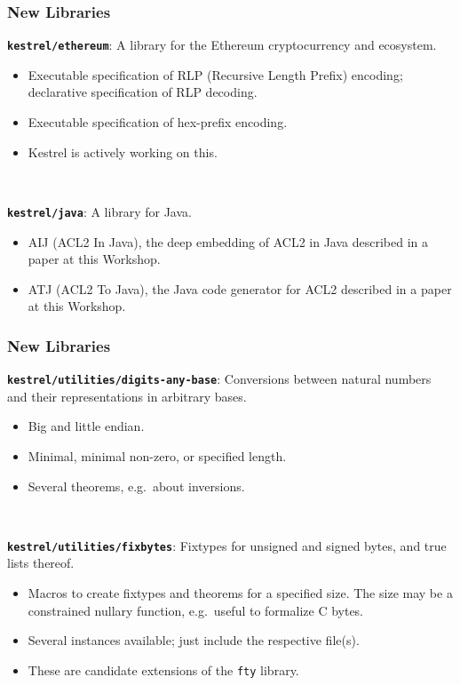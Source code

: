 \documentclass{beamer}
\newcommand{\code}[1]{\texttt{#1}}
\newcommand{\bookpath}[1]{\textbf{\code{#1}}}
\newcommand{\newlibtitle}{\frametitle{New Libraries}}
\begin{document}

\begin{frame}

\newlibtitle

\bookpath{kestrel/ethereum}:
A library for the Ethereum
cryptocurrency and ecosystem.
\begin{itemize}
\item
Executable specification of RLP (Recursive Length Prefix) encoding;
declarative specification of RLP decoding.
\item
Executable specification of hex-prefix encoding.
\item
Kestrel is actively working on this.
\end{itemize}

\

\bookpath{kestrel/java}:
A library for Java.
\begin{itemize}
\item
AIJ (ACL2 In Java), the deep embedding of ACL2 in Java
described in a paper at this Workshop.
\item
ATJ (ACL2 To Java), the Java code generator for ACL2
described in a paper at this Workshop.
\end{itemize}

\end{frame}


\begin{frame}[fragile]

\newlibtitle

\bookpath{kestrel/utilities/digits-any-base}:
Conversions between natural numbers
and their representations in arbitrary bases.
\begin{itemize}
\item
Big and little endian.
\item
Minimal, minimal non-zero, or specified length.
\item
Several theorems, e.g.\ about inversions.
\end{itemize}

\

\bookpath{kestrel/utilities/fixbytes}:
Fixtypes for unsigned and signed bytes, and true lists thereof.
\begin{itemize}
\item
Macros to create fixtypes and theorems for a specified size.
The size may be a constrained nullary function,
e.g.\ useful to formalize C bytes.
\item
Several instances available; just include the respective file(s).
\item
These are candidate extensions of the \code{fty} library.
\end{itemize}

\end{frame}
\end{document}
